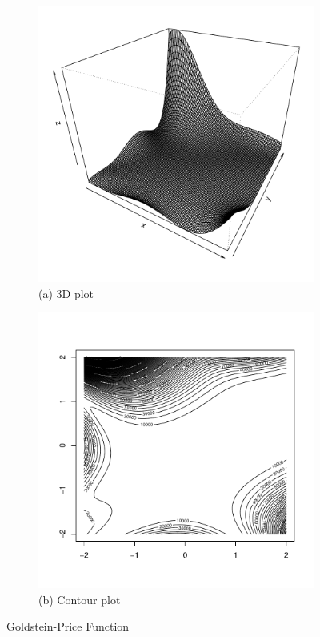 \documentclass [PhD] {package/uclathes}
\begin{document}
\begin{figure}%
\centering
\begin{subfigure}[b]{0.4\textwidth}
\centering
\includegraphics[width=\textwidth]{chapters/EGO/pdfs/goldpr_fun}
\caption*{(a) 3D plot}
\end{subfigure}
\hfill
\begin{subfigure}[b]{0.4\textwidth}
\centering
\includegraphics[width=\textwidth]{chapters/EGO/pdfs/goldpr_contour}
  \caption*{(b) Contour plot}
\end{subfigure}
\caption{Goldstein-Price Function}
    \label{fig:goldpr}
\end{figure}
\end{document}
